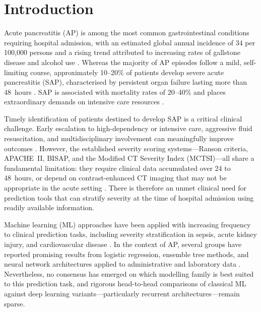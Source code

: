 \documentclass[12pt,a4paper]{article}
\begin{document}
\clearpage

\section{Introduction}

Acute pancreatitis (AP) is among the most common gastrointestinal conditions requiring hospital admission, with an estimated global annual incidence of 34 per 100,000 persons and a rising trend attributed to increasing rates of gallstone disease and alcohol use \citep{Lankisch2015}. Whereas the majority of AP episodes follow a mild, self-limiting course, approximately 10--20\% of patients develop severe acute pancreatitis (SAP), characterised by persistent organ failure lasting more than 48~hours \citep{Banks2013}. SAP is associated with mortality rates of 20--40\% and places extraordinary demands on intensive care resources \citep{Petrov2010, Garg2018}.

Timely identification of patients destined to develop SAP is a critical clinical challenge. Early escalation to high-dependency or intensive care, aggressive fluid resuscitation, and multidisciplinary involvement can meaningfully improve outcomes \citep{Tenner2013}. However, the established severity scoring systems—Ranson criteria, APACHE~II, BISAP, and the Modified CT Severity Index (MCTSI)—all share a fundamental limitation: they require clinical data accumulated over 24 to 48~hours, or depend on contrast-enhanced CT imaging that may not be appropriate in the acute setting \citep{Papachristou2010, Wu2011, Bollen2012}. There is therefore an unmet clinical need for prediction tools that can stratify severity at the time of hospital admission using readily available information.

Machine learning (ML) approaches have been applied with increasing frequency to clinical prediction tasks, including severity stratification in sepsis, acute kidney injury, and cardiovascular disease \citep{Rajpurkar2022}. In the context of AP, several groups have reported promising results from logistic regression, ensemble tree methods, and neural network architectures applied to administrative and laboratory data \citep{Qiu2021, Mofidi2009, Mounzer2012}. Nevertheless, no consensus has emerged on which modelling family is best suited to this prediction task, and rigorous head-to-head comparisons of classical ML against deep learning variants—particularly recurrent architectures—remain sparse.
\end{document}
